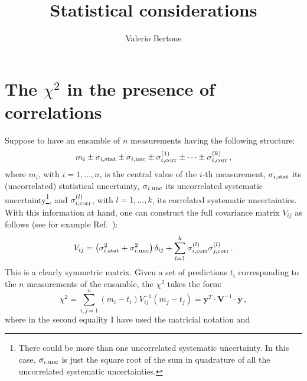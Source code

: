 \documentclass[10pt,a4paper]{article}
\begin{document}
\title{Statistical considerations}

\author{Valerio Bertone}

\maketitle

\tableofcontents{}
\section{The $\chi^2$ in the presence of correlations}

Suppose to have an ensamble of $n$ measurements having the following
structure:
\begin{equation}
  m_i\pm \sigma_{i,\rm stat} \pm \sigma_{i,\rm unc} \pm \sigma_{i,\rm
    corr}^{(1)}\pm\dots \pm \sigma_{i,\rm
    corr}^{(k)}\,,
\end{equation}
where $m_i$, with $i=1,\dots, n$, is the central value of the $i$-th
measurement, $\sigma_{i,\rm stat}$ its (uncorrelated) statistical
uncertainty, $\sigma_{i,\rm unc}$ its uncorrelated systematic
uncertainty\footnote{There could be more than one uncorrelated
  systematic uncertainty. In this case, $\sigma_{i,\rm unc}$ is just
  the square root of the sum in quadrature of all the uncorrelated
  systematic uncertainties.}, and $\sigma_{i,\rm corr}^{(l)}$, with
$l=1,\dots,k$, its correlated systematic uncertainties. With this
information at hand, one can construct the full covariance matrix
$V_{ij}$ as follows (see for example Ref.~\cite{Ball:2012wy}):
\begin{equation}\label{eq:covmat}
  V_{ij}=\left(\sigma_{i,\rm stat}^2 +\sigma_{i,\rm unc}^2\right)\delta_{ij} + \sum_{l=1}^{k}\sigma_{i,\rm
    corr}^{(l)}\sigma_{j,\rm
    corr}^{(l)}\,.
\end{equation}
This is a clearly symmetric matrix. Given a set of predictions $t_i$
corresponding to the $n$ measurements of the ensamble, the $\chi^2$
takes the form:
\begin{equation}\label{eq:chi2cov}
  \chi^2=
  \sum_{i,j=1}^{n}\left(m_i-t_i\right)V_{ij}^{-1}\left(m_j-t_j\right) =
  \mathbf{y}^{T} \cdot \mathbf{V}^{-1} \cdot \mathbf{y}\,,
\end{equation}
where in the second equality I have used the matricial notation and
\end{document}
